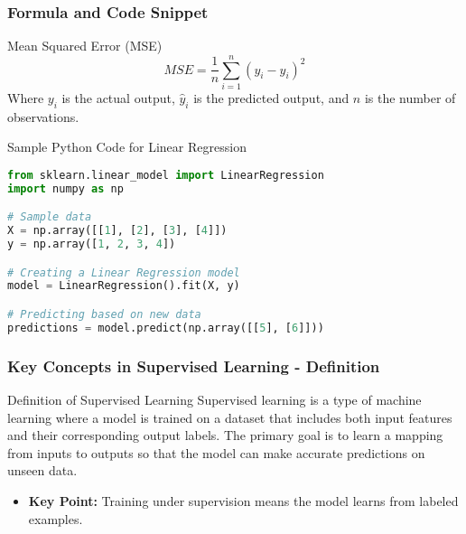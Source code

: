 \documentclass[aspectratio=169]{beamer}
\begin{document}
\begin{frame}[fragile]
    \frametitle{Formula and Code Snippet}
    \begin{block}{Mean Squared Error (MSE)}
        \begin{equation}
            MSE = \frac{1}{n} \sum_{i=1}^{n} (y_i - \hat{y}_i)^2
        \end{equation}
        Where \(y_i\) is the actual output, \(\hat{y}_i\) is the predicted output, and \(n\) is the number of observations.
    \end{block}

    \begin{block}{Sample Python Code for Linear Regression}
        \begin{lstlisting}[language=Python]
from sklearn.linear_model import LinearRegression
import numpy as np

# Sample data
X = np.array([[1], [2], [3], [4]])
y = np.array([1, 2, 3, 4])

# Creating a Linear Regression model
model = LinearRegression().fit(X, y)

# Predicting based on new data
predictions = model.predict(np.array([[5], [6]]))
        \end{lstlisting}
    \end{block}
\end{frame}

\begin{frame}[fragile]
    \frametitle{Key Concepts in Supervised Learning - Definition}
    \begin{block}{Definition of Supervised Learning}
        Supervised learning is a type of machine learning where a model is trained on a dataset that includes both input features and their corresponding output labels. The primary goal is to learn a mapping from inputs to outputs so that the model can make accurate predictions on unseen data.
    \end{block}
    
    \begin{itemize}
        \item \textbf{Key Point:} Training under supervision means the model learns from labeled examples.
    \end{itemize}
\end{frame}
\end{document}
